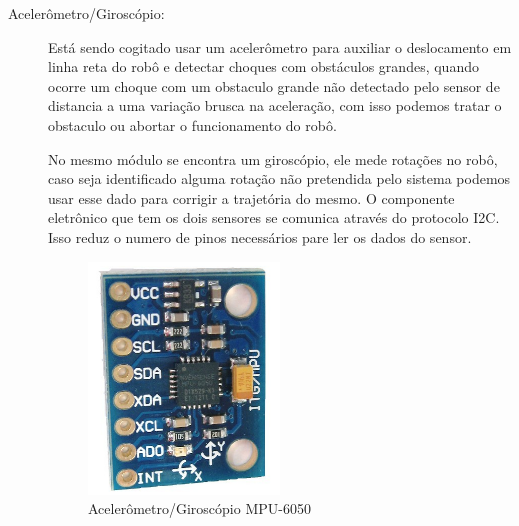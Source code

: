 \begin{description}
\item[Acelerômetro/Giroscópio:] Está sendo cogitado usar um acelerômetro
para auxiliar o deslocamento em linha reta do robô e detectar choques com
obstáculos grandes, quando ocorre um choque com um obstaculo grande não
detectado pelo sensor de distancia a uma variação brusca na aceleração, com
isso podemos tratar o obstaculo ou abortar o funcionamento do robô.
\par
No mesmo módulo se encontra um giroscópio, ele mede rotações no robô, caso
seja identificado alguma rotação não pretendida pelo sistema podemos usar esse
dado para corrigir a trajetória do mesmo. O componente eletrônico que tem os
dois sensores se comunica através do protocolo I2C. Isso reduz o numero de
pinos necessários pare ler os dados do sensor.
\par
\begin{figure}[h]
  \centering
  \includegraphics[width=0.5\textwidth]{figures/accelerometer.png}
  \caption{Acelerômetro/Giroscópio MPU-6050}
  \label{fig:accelerometer}
\end{figure}
\FloatBarrier


\end{description}

